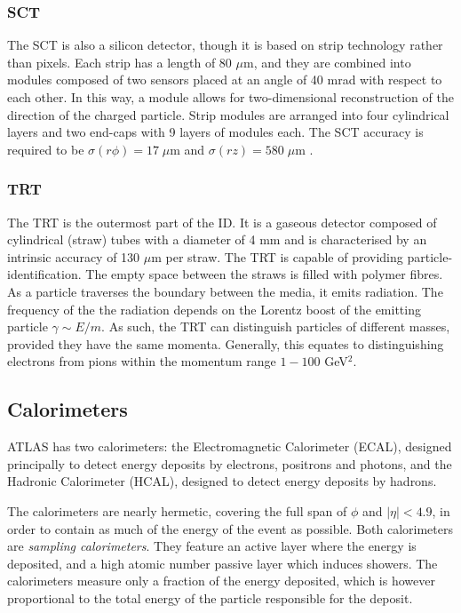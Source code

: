 \documentclass[10pt,a4paper]{book}
\begin{document}
\subsubsection{SCT}
The SCT is also a silicon detector, though it is based on strip technology rather than pixels. Each strip has a length
of 80 $\mu$m, and they are combined into modules composed of two sensors placed at an angle of 40 mrad with respect to each other. In this way, a module allows for two-dimensional reconstruction of the direction of the charged particle. Strip modules are arranged into four cylindrical layers and two end-caps with 9 layers of modules each. The SCT accuracy is required to be $\sigma(r\phi) = 17 \; \mu\text{m}$ and $\sigma(rz) = 580 \; \mu\text{m}$ \cite{Sandaker:1089261}.

\subsubsection{TRT}
The TRT is the outermost part of the ID. It is a gaseous detector composed of cylindrical (straw) tubes with a diameter of 4 mm and is characterised by an intrinsic accuracy of 130 $\mu$m per straw.  The TRT is capable of providing particle-identification. The empty space between the straws is filled with polymer fibres. As a particle traverses the boundary between the media, it emits radiation. The frequency of the the radiation depends on the Lorentz boost of the emitting particle $\gamma \sim E/m$. As such, the TRT can distinguish particles of different masses, provided they have the same momenta. Generally, this equates to distinguishing electrons from pions within the momentum range $1-100$ GeV$^2$.  

\subsection{Calorimeters}

ATLAS has two calorimeters: the Electromagnetic Calorimeter (ECAL), designed principally to detect energy deposits by electrons, positrons and photons, and the Hadronic Calorimeter (HCAL), designed to detect energy deposits by hadrons. 

The calorimeters are nearly hermetic, covering the full span of $\phi$ and $\vert \eta \vert < 4.9$, in order to contain as much of the energy of the event as possible. Both calorimeters are \emph{sampling calorimeters}. They feature an active layer where the energy is deposited, and a high atomic number passive layer which induces showers. The calorimeters measure only a fraction of the energy deposited, which is however proportional to the total energy of the particle responsible for the deposit. 
\end{document}
